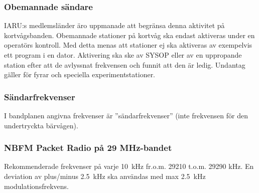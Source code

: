 \subsubsection{Obemannade sändare}

IARU:s medlemsländer äro uppmanade att begränsa
denna aktivitet på kortvågsbanden.
Obemannade stationer på kortvåg ska endast aktiveras under en operatörs kontroll.
Med detta menas att stationer ej ska aktiveras av
exempelvis ett program i en dator. Aktivering ska ske
av SYSOP eller av en uppropande station efter att de
avlyssnat frekvensen och funnit att den är ledig.
Undantag gäller för fyrar och speciella experimentstationer.

\subsubsection{Sändarfrekvenser}

I bandplanen angivna frekvenser är ''sändarfrekvenser''
(inte frekvensen för den undertryckta bärvågen).

\subsubsection{NBFM Packet Radio på 29 MHz-bandet}

Rekommenderade frekvenser på varje 10~kHz fr.o.m.
29210 t.o.m. 29290 kHz.
En deviation av plus/minus 2.5~kHz ska användas med
max 2.5~kHz modulationsfrekvens.
